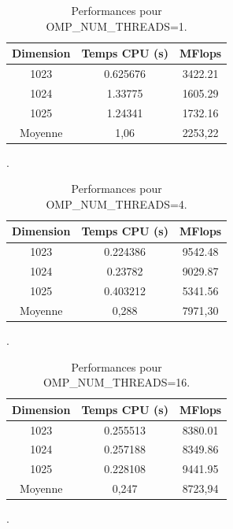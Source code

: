 \documentclass[a4paper,13pt]{book}
\begin{document}
\begin{table}[h!]
    \begin{center}
    \begin{tabular}{|c|c|c|}
        \hline
        Dimension & Temps CPU (s) & MFlops \\ \hline
        1023      & 0.625676       & 3422.21 \\ \hline
        1024      & 1.33775       & 1605.29 \\ \hline
        1025      & 1.24341        & 1732.16 \\ \hline
        Moyenne      & 1,06        & 2253,22 \\ \hline
    \end{tabular}
    \caption{Performances pour OMP\_NUM\_THREADS=1.}
\end{center}
\end{table}.

\begin{table}[h!]
    \begin{center}
    \begin{tabular}{|c|c|c|}
        \hline
        Dimension & Temps CPU (s) & MFlops \\ \hline
        1023      & 0.224386       & 9542.48 \\ \hline
        1024      & 0.23782       & 9029.87 \\ \hline
        1025      & 0.403212        & 5341.56 \\ \hline
        Moyenne      & 0,288        & 7971,30 \\ \hline
    \end{tabular}
    \caption{Performances pour OMP\_NUM\_THREADS=4.}
\end{center}
\end{table}.

\begin{table}[h!]
    \begin{center}
    \begin{tabular}{|c|c|c|}
        \hline
        Dimension & Temps CPU (s) & MFlops \\ \hline
        1023      & 0.255513       & 8380.01 \\ \hline
        1024      & 0.257188       &  8349.86 \\ \hline
        1025      & 0.228108        & 9441.95 \\ \hline
        Moyenne      & 0,247        & 8723,94 \\ \hline
    \end{tabular}
    \caption{Performances pour OMP\_NUM\_THREADS=16.}
\end{center}
\end{table}.
\end{document}
